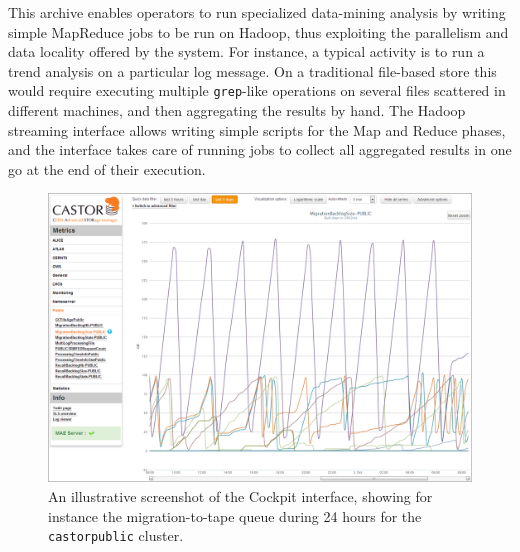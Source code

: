 This archive enables operators to run specialized data-mining analysis by writing simple MapReduce jobs to be run on Hadoop, thus exploiting the parallelism and data locality offered by the system. For instance, a typical activity is to run a trend analysis on a particular log message. On a traditional file-based store this would require executing multiple \texttt{grep}-like operations on several files scattered in different machines, and then aggregating the results by hand. The Hadoop streaming interface allows writing simple scripts for the Map and Reduce phases, and the interface takes care of running jobs to collect all aggregated results in one go at the end of their execution.

\begin{figure}[h]
\begin{center}
\includegraphics[width=36pc]{cockpit_screenshot.png}
\caption{\label{fig:scr}An illustrative screenshot of the Cockpit interface, showing for instance the migration-to-tape queue during 24 hours for the \texttt{castorpublic} cluster.}
\end{center}
\end{figure}
